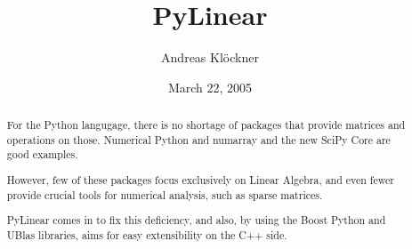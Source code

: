 \documentclass[hyperref]{manual}
\title{PyLinear}
\author{Andreas Kl\"ockner}
\date{March 22, 2005}
\begin{document}
\maketitle

\begin{abstract}
  \noindent
  For the Python langugage, there is no shortage of packages that
  provide matrices and operations on those. Numerical Python and
  numarray and the new SciPy Core are good examples.

  However, few of these packages focus exclusively on Linear Algebra,
  and even fewer provide crucial tools for numerical analysis, such as
  sparse matrices.

  PyLinear comes in to fix this deficiency, and also, by using the 
  Boost Python and UBlas libraries, aims for easy extensibility on the C++ side.
\end{abstract}

\tableofcontents









\appendix




\end{document}
